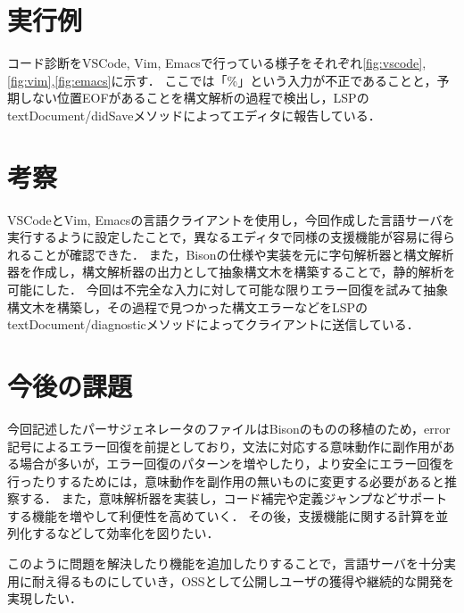 \documentclass[fontsize=9bp,twocolumn,column_gap=2.36zw,a4paper,report]{jlreq}
\begin{document}
\begin{figure}[h]
\end{figure}

\chapter{実行例}

コード診断をVSCode, Vim, Emacsで行っている様子をそれぞれ\ref{fig:vscode},\ref{fig:vim},\ref{fig:emacs}に示す．
ここでは「\%」という入力が不正であることと，予期しない位置EOFがあることを構文解析の過程で検出し，LSPのtextDocument/didSaveメソッドによってエディタに報告している．

\begin{figure}[h]
\end{figure}
\begin{figure}[h]
\end{figure}
\begin{figure}[h]
\end{figure}

\chapter{考察}

VSCodeとVim, Emacsの言語クライアントを使用し，今回作成した言語サーバを実行するように設定したことで，異なるエディタで同様の支援機能が容易に得られることが確認できた．
また，Bisonの仕様や実装を元に字句解析器と構文解析器を作成し，構文解析器の出力として抽象構文木を構築することで，静的解析を可能にした．
今回は不完全な入力に対して可能な限りエラー回復を試みて抽象構文木を構築し，その過程で見つかった構文エラーなどをLSPのtextDocument/diagnosticメソッドによってクライアントに送信している．
\newline

\chapter{今後の課題}

今回記述したパーサジェネレータのファイルはBisonのものの移植のため，error記号によるエラー回復を前提としており，文法に対応する意味動作に副作用がある場合が多いが，エラー回復のパターンを増やしたり，より安全にエラー回復を行ったりするためには，意味動作を副作用の無いものに変更する必要があると推察する．
また，意味解析器を実装し，コード補完や定義ジャンプなどサポートする機能を増やして利便性を高めていく．
その後，支援機能に関する計算を並列化するなどして効率化を図りたい．\par
このように問題を解決したり機能を追加したりすることで，言語サーバを十分実用に耐え得るものにしていき，OSSとして公開しユーザの獲得や継続的な開発を実現したい．
\newline
\end{document}

